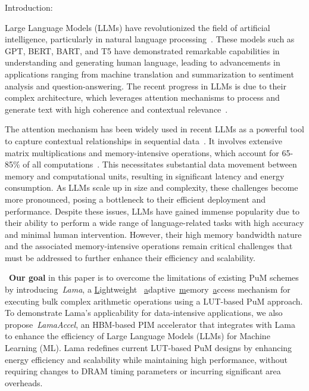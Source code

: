 Introduction:

Large Language Models (LLMs) have revolutionized the field of artificial intelligence, particularly in natural language processing~\cite{lipton}. These models such as GPT, BERT, BART, and T5 have demonstrated remarkable capabilities in understanding and generating human language, leading to advancements in applications ranging from machine translation and summarization to sentiment analysis and question-answering. The recent progress in LLMs is due to their complex architecture, which leverages attention mechanisms to process and generate text with high coherence and contextual relevance~\cite{attention}.

The attention mechanism has been widely used in recent LLMs as a powerful tool to capture contextual relationships in sequential data~\cite{attention}. It involves extensive matrix multiplications and memory-intensive operations, which account for 65-85\% of all computations~\cite{analysis_mms}. This necessitates substantial data movement between memory and computational units, resulting in significant latency and energy consumption. As LLMs scale up in size and complexity, these challenges become more pronounced, posing a bottleneck to their efficient deployment and performance. Despite these issues, LLMs have gained immense popularity due to their ability to perform a wide range of language-related tasks with high accuracy and minimal human intervention. However, their high memory bandwidth nature and the associated memory-intensive operations remain critical challenges that must be addressed to further enhance their efficiency and scalability. %

~\textbf{Our goal} in this paper is to overcome the limitations of existing PuM schemes by introducing~\textit{Lama}, a \underline{L}ightweight ~\underline{a}daptive~\underline{m}emory~\underline{a}ccess mechanism for executing bulk complex arithmetic operations using a LUT-based PuM approach. To demonstrate Lama's applicability for data-intensive applications, we also propose~\textit{LamaAccel}, an HBM-based PIM accelerator that integrates with Lama to enhance the efficiency of Large Language Models (LLMs) for Machine Learning (ML). Lama redefines current LUT-based PuM designs by enhancing energy efficiency and scalability while maintaining high performance, without requiring changes to DRAM timing parameters or incurring significant area overheads.


